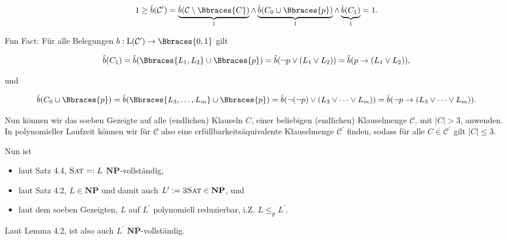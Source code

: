 \begin{solution}
\begin{align*}
    1
    \geq
    \hat b(\mathcal C^\prime)
    =
    \underbrace{\hat b(\mathcal C \setminus \Bbraces{C})}_1
    \land
    \underbrace{\hat b(C_0 \cup \Bbraces{p})}_1
    \land
    \underbrace{\hat b(C_1)}_1
    =
    1.
\end{align*}

Fun Fact:
Für alle Belegungen $b: \operatorname L(\mathcal C^\prime) \to \Bbraces{0, 1}$ gilt

\begin{align*}
    \hat b(C_1)
    =
    \hat b(\Bbraces{L_1, L_2} \cup \Bbraces{p})
    =
    \hat b(\neg p \lor (L_1 \lor L_2))
    =
    \hat b(p \to (L_1 \lor L_2)),
\end{align*}

und

\begin{align*}
    \hat b(C_0 \cup \Bbraces{p})
    =
    \hat b(\Bbraces{L_3, \dots, L_m} \cup \Bbraces{p})
    =
    \hat b(\neg (\neg p) \lor (L_3 \lor \dots \lor L_m))
    =
    \hat b(\neg p \to (L_3 \lor \dots \lor L_m)).
\end{align*}

Nun können wir das soeben Gezeigte auf alle (endlichen) Klauseln $C$, einer beliebigen (endlichen) Klauselmenge $\mathcal C$, mit $|C| > 3$, anwenden.
In polynomieller Laufzeit können wir für $\mathcal C$ also eine erfüllbarkeitsäquivalente Klauselmenge $\mathcal C^\prime$ finden, sodass für alle $C \in \mathcal C^\prime$ gilt $|C| \leq 3$.

Nun ist

\begin{itemize}
    \item laut Satz 4.4, $\textsc{Sat} =: L$ $\mathbf{NP}$-vollständig,
    \item laut Satz 4.2, $L \in \mathbf{NP}$ und damit auch $L^\prime := \textsc{3Sat} \in \mathbf{NP}$, und
    \item laut dem soeben Gezeigten, $L$ auf $L^\prime$ polynomiell reduzierbar, i.Z. $L \leq_\mathrm{p} L^\prime$.
\end{itemize}

Laut Lemma 4.2, ist also auch $L^\prime$ $\mathbf{NP}$-vollständig.

\end{solution}

